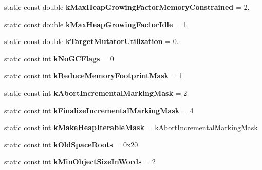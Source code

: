 \begin{DoxyCompactItemize}
\item 
static const double {\bfseries k\+Max\+Heap\+Growing\+Factor\+Memory\+Constrained} = 2.\hypertarget{classv8_1_1internal_1_1_heap_a4847d31f3e84a85628afda011f3361df}{}\label{classv8_1_1internal_1_1_heap_a4847d31f3e84a85628afda011f3361df}

\item 
static const double {\bfseries k\+Max\+Heap\+Growing\+Factor\+Idle} = 1.\hypertarget{classv8_1_1internal_1_1_heap_aead20301f6f7d28eb2ff57ee3eb157fa}{}\label{classv8_1_1internal_1_1_heap_aead20301f6f7d28eb2ff57ee3eb157fa}

\item 
static const double {\bfseries k\+Target\+Mutator\+Utilization} = 0.\hypertarget{classv8_1_1internal_1_1_heap_a14bf77e0a89d526159da804454662421}{}\label{classv8_1_1internal_1_1_heap_a14bf77e0a89d526159da804454662421}

\item 
static const int {\bfseries k\+No\+G\+C\+Flags} = 0\hypertarget{classv8_1_1internal_1_1_heap_a961837df65c137b572023585c5c72191}{}\label{classv8_1_1internal_1_1_heap_a961837df65c137b572023585c5c72191}

\item 
static const int {\bfseries k\+Reduce\+Memory\+Footprint\+Mask} = 1\hypertarget{classv8_1_1internal_1_1_heap_a1792e93ed5d827373c21b9a99bc19c54}{}\label{classv8_1_1internal_1_1_heap_a1792e93ed5d827373c21b9a99bc19c54}

\item 
static const int {\bfseries k\+Abort\+Incremental\+Marking\+Mask} = 2\hypertarget{classv8_1_1internal_1_1_heap_a70df0482b0c5f555696f1962656a0d38}{}\label{classv8_1_1internal_1_1_heap_a70df0482b0c5f555696f1962656a0d38}

\item 
static const int {\bfseries k\+Finalize\+Incremental\+Marking\+Mask} = 4\hypertarget{classv8_1_1internal_1_1_heap_a8c3590d52cce554adb0d2de6eaaf579c}{}\label{classv8_1_1internal_1_1_heap_a8c3590d52cce554adb0d2de6eaaf579c}

\item 
static const int {\bfseries k\+Make\+Heap\+Iterable\+Mask} = k\+Abort\+Incremental\+Marking\+Mask\hypertarget{classv8_1_1internal_1_1_heap_a63d0cdfe1c567474e7351d642089eea1}{}\label{classv8_1_1internal_1_1_heap_a63d0cdfe1c567474e7351d642089eea1}

\item 
static const int {\bfseries k\+Old\+Space\+Roots} = 0x20\hypertarget{classv8_1_1internal_1_1_heap_a7d062ecab22270f09427f51c5cb35458}{}\label{classv8_1_1internal_1_1_heap_a7d062ecab22270f09427f51c5cb35458}

\item 
static const int {\bfseries k\+Min\+Object\+Size\+In\+Words} = 2\hypertarget{classv8_1_1internal_1_1_heap_a5305f38fc349d1dd00c330e0552218e1}{}\label{classv8_1_1internal_1_1_heap_a5305f38fc349d1dd00c330e0552218e1}

\end{DoxyCompactItemize}
